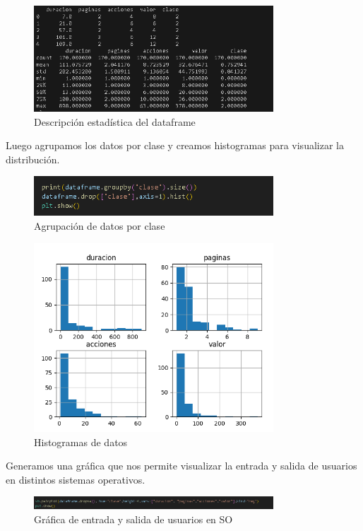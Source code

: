 \documentclass{article}
\begin{document}
\begin{figure}[H]
    \centering
    \includegraphics[width=0.8\textwidth]{img/3.png}
    \caption{Descripción estadística del dataframe}
\end{figure}

Luego agrupamos los datos por clase y creamos histogramas para visualizar la distribución.

\begin{figure}[H]
    \centering
    \includegraphics[width=0.8\textwidth]{img/4.png}
    \caption{Agrupación de datos por clase}
\end{figure}

\begin{figure}[H]
    \centering
    \includegraphics[width=0.8\textwidth]{img/5.png}
    \caption{Histogramas de datos}
\end{figure}

Generamos una gráfica que nos permite visualizar la entrada y salida de usuarios en distintos sistemas operativos.

\begin{figure}[H]
    \centering
    \includegraphics[width=0.8\textwidth]{img/6.png}
    \caption{Gráfica de entrada y salida de usuarios en SO}
\end{figure}
\end{document}
